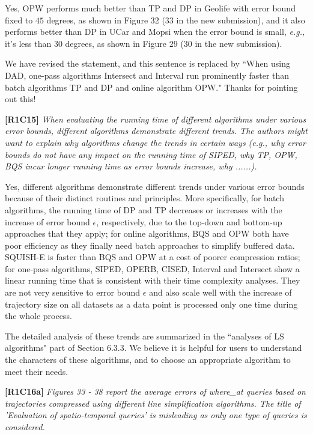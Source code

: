 \documentclass{letter}
\newcommand{\eg}{\emph{e.g.,}\xspace}
\begin{document}
{Yes, OPW performs much better than TP and DP in Geolife with error bound fixed to $45$ degrees, as shown in Figure 32 (33 in the new submission), and it also performs better than DP in UCar and Mopsi when the error bound is small, \eg it's less than 30 degrees, as shown in Figure 29 (30 in the new submission).

We have revised the statement, and this sentence is replaced by ``When using DAD, one-pass algorithms Intersect and Interval run prominently faster than batch algorithms TP and DP and online algorithm OPW." 
Thanks for pointing out this!

\textbf{[R1C15]} \emph{ When evaluating the running time of different algorithms under various error bounds, different algorithms demonstrate different trends. The authors might want to explain why algorithms change the trends in certain ways (e.g., why error bounds do not have any impact on the running time of SIPED, why TP, OPW, BQS incur longer running time as error bounds increase, why ......).}

Yes, different algorithms demonstrate different trends under various error bounds because of their distinct routines and principles. More specifically,
for batch algorithms, the running time of DP and TP decreases or increases with the increase of error bound $\epsilon$, respectively, due to the top-down and bottom-up approaches that they apply;
%
for online algorithms, BQS and OPW both have poor efficiency as they finally need batch approaches to simplify buffered data. SQUISH-E is faster than BQS and OPW at a cost of poorer compression ratios;
%
for one-pass algorithms, SIPED, OPERB, CISED, Interval and Intersect show a linear running time that is consistent with their time complexity analyses. They are not very sensitive to error bound $\epsilon$ and also scale well with the increase of trajectory size on all datasets as a data point is processed only one time during the whole process. 

The detailed analysis of these trends are summarized in the ``analyses of LS algorithms" part of Section 6.3.3. 
%
We believe it is helpful for users to understand the characters of these algorithms, and to choose an appropriate algorithm to meet their needs.

\textbf{[R1C16a]} \emph{ Figures 33 - 38 report the average errors of where\_at queries based on trajectories compressed using different line simplification algorithms. The title of 'Evaluation of spatio-temporal queries' is misleading as only one type of queries is considered.} 

}
\end{document}
